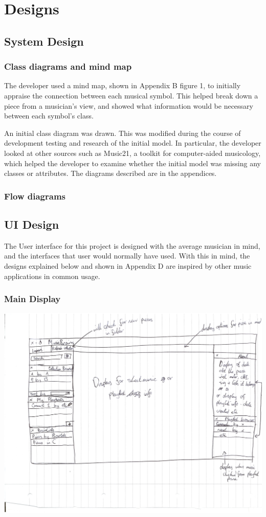 \section{Designs}
\subsection{System Design}
\subsubsection{Class diagrams and mind map}
The developer used a mind map, shown in Appendix B figure 1, to initially appraise the connection between each musical symbol. This helped break down a piece from a musician's view, and showed what information would be necessary between each symbol's class.

An initial class diagram was drawn. This was modified during the course of development testing and research of the initial model. In particular, the developer looked at other sources such as Music21, a toolkit for computer-aided musicology\parencite{Music21}, which helped the developer to examine whether the initial model was missing any classes or attributes. The diagrams described are in the appendices.
\subsubsection{Flow diagrams}
\subsection{UI Design}
The User interface for this project is designed with the average musician in mind, and the interfaces that user would normally have used. With this in mind, the designs explained below and shown in Appendix D are inspired by other music applications in common usage.

\subsubsection{Main Display}
\begin{center}
\includegraphics[width=380pt]{main_view.png}
\end{center}

